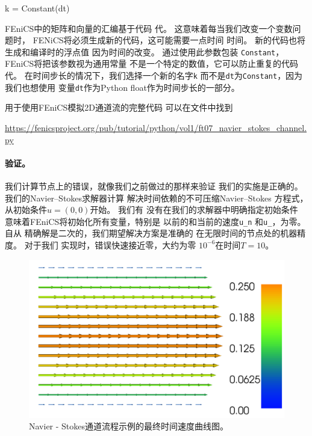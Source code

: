 \begin{python}
k = Constant(dt)
\end{python}

FEniCS中的矩阵和向量的汇编基于代码
代。 这意味着每当我们改变一个变数问题时，
FENiCS将必须生成新的代码，这可能需要一点时间
时间。 新的代码也将生成和编译时的浮点值
因为时间的改变。 通过使用此参数包装
\texttt{Constant}，FEniCS将把该参数视为通用常量
不是一个特定的数值，它可以防止重复的代码
代。 在时间步长的情况下，我们选择一个新的名字\texttt{k}
而不是\texttt{dt}为\texttt{Constant}，因为我们也想使用
变量\texttt{dt}作为Python float作为时间步长的一部分。

用于使用FEniCS模拟2D通道流的完整代码
可以在文件中找到
\begin{center}
  \url{https://fenicsproject.org/pub/tutorial/python/vol1/ft07_navier_stokes_channel.py}
\end{center}


\paragraph{验证。}

我们计算节点上的错误，就像我们之前做过的那样来验证
我们的实施是正确的。 我们的Navier--Stokes求解器计算
解决时间依赖的不可压缩Navier--Stokes
方程式，从初始条件$u =(0, 0)$开始。 我们有
没有在我们的求解器中明确指定初始条件
意味着FEniCS将初始化所有变量，特别是
以前的和当前的速度\verb!u_n! 和\verb!u_!，为零。 自从
精确解是二次的，我们期望解决方案是准确的
在无限时间的节点处的机器精度。 对于我们
实现时，错误快速接近零，大约为零
$10^{-6}$在时间$T = 10$。

\begin{figure}[!ht]  %
 \centerline{\includegraphics[width=0.95\linewidth]{fig/navier_stokes_channel.png}}
 \caption{
 Navier - Stokes通道流程示例的最终时间速度曲线图。\label{ftut1:fig:navier_stokes_channel}
 }
\end{figure}

